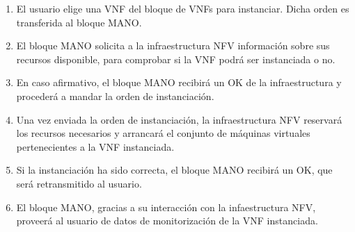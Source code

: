 \begin{enumerate}
	\item El usuario elige una VNF del bloque de VNFs para instanciar. Dicha orden es transferida al bloque MANO.
	\item El bloque MANO solicita a la infraestructura NFV información sobre sus recursos disponible, para comprobar si la VNF podrá ser instanciada o no.
	\item En caso afirmativo, el bloque MANO recibirá un OK de la infraestructura y procederá a mandar la orden de instanciación.
	\item Una vez enviada la orden de instanciación, la infraestructura NFV reservará los recursos necesarios y arrancará el conjunto de máquinas virtuales pertenecientes a la VNF instanciada.
	\item Si la instanciación ha sido correcta, el bloque MANO recibirá un OK, que será retransmitido al usuario.
	\item El bloque MANO, gracias a su interacción con la infaestructura NFV, proveerá al usuario de datos de monitorización de la VNF instanciada.
\end{enumerate}

\cleardoublepage